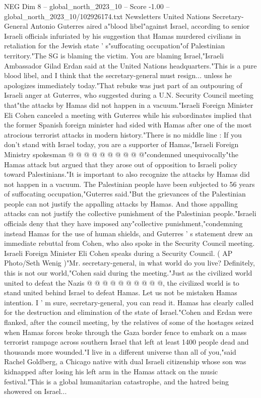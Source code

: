 \begin{textsample}{NEG Dim 8 – global\_north\_2023\_10 – Score -1.00 – global\_north\_2023\_10/102926174.txt}  \label{ex:f8_neg_216}
Newsletters United Nations Secretary-General Antonio Guterres aired a"blood libel"against Israel, according to senior Israeli officials infuriated by his suggestion that Hamas murdered civilians in retaliation for the Jewish state ' s"suffocating occupation"of Palestinian territory."The SG is blaming the victim.
You are blaming Israel,"Israeli Ambassador Gilad Erdan said at the United Nations headquarters."This is a pure blood libel, and I think that the secretary-general must resign... unless he apologizes immediately today."That rebuke was just part of an outpouring of Israeli anger at Guterres, who suggested during a U.N.
Security Council meeting that"the attacks by Hamas did not happen in a vacuum."Israeli Foreign Minister Eli Cohen canceled a meeting with Guterres while his subordinates implied that the former Spanish foreign minister had sided with Hamas after one of the most atrocious terrorist attacks in modern history."There is no middle line : If you don't stand with Israel today, you are a supporter of Hamas,"Israeli Foreign Ministry spokesman @ @ @ @ @ @ @ @ @ @"condemned unequivocally"the Hamas attack but argued that they arose out of opposition to Israeli policy toward Palestinians."It is important to also recognize the attacks by Hamas did not happen in a vacuum.
The Palestinian people have been subjected to 56 years of suffocating occupation,"Guterres said."But the grievances of the Palestinian people can not justify the appalling attacks by Hamas.
And those appalling attacks can not justify the collective punishment of the Palestinian people."Israeli officials deny that they have imposed any"collective punishment,"condemning instead Hamas for the use of human shields, and Guterres ' s statement drew an immediate rebuttal from Cohen, who also spoke in the Security Council meeting.
Israeli Foreign Minister Eli Cohen speaks during a Security Council. ( AP Photo/Seth Wenig )"Mr. secretary-general, in what world do you live?
Definitely, this is not our world,"Cohen said during the meeting."Just as the civilized world united to defeat the Nazis @ @ @ @ @ @ @ @ @ @, the civilized world is to stand united behind Israel to defeat Hamas.
Let us not be mistaken Hamas intention.
I ' m sure, secretary-general, you can read it.
Hamas has clearly called for the destruction and elimination of the state of Israel."Cohen and Erdan were flanked, after the council meeting, by the relatives of some of the hostages seized when Hamas forces broke through the Gaza border fence to embark on a mass terrorist rampage across southern Israel that left at least 1400 people dead and thousands more wounded."I live in a different universe than all of you,"said Rachel Goldberg, a Chicago native with dual Israeli citizenship whose son was kidnapped after losing his left arm in the Hamas attack on the music festival."This is a global humanitarian catastrophe, and the hatred being showered on Israel...

\end{textsample}
